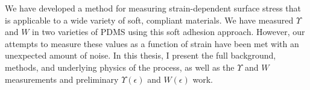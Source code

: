 We have developed a method for measuring strain-dependent surface stress that is applicable to a wide variety of soft, compliant materials. We have measured $ \Upsilon $ and $ W $ in two varieties of PDMS using this soft adhesion approach. However, our attempts to measure these values as a function of strain have been met with an unexpected amount of noise.   In this thesis, I present the full background, methods, and underlying physics of the process, as well as the $ \Upsilon $ and $ W $ measurements and preliminary $ \Upsilon(\epsilon) $ and $ W(\epsilon) $ work.  



 





